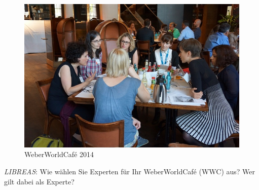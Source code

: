 \documentclass[a4paper,
fontsize=11pt,
oneside,
numbers=noperiodatend,
parskip=half-,
bibliography=totoc,
final
]{scrartcl}
\begin{document}
\begin{figure}[htbp]
\centering
\includegraphics{wwc1.jpg}
\caption{WeberWorldCafé 2014}
\end{figure}

\emph{LIBREAS}: Wie wählen Sie Experten für Ihr WeberWorldCafé (WWC)
aus? Wer gilt dabei als Experte?
\end{document}
